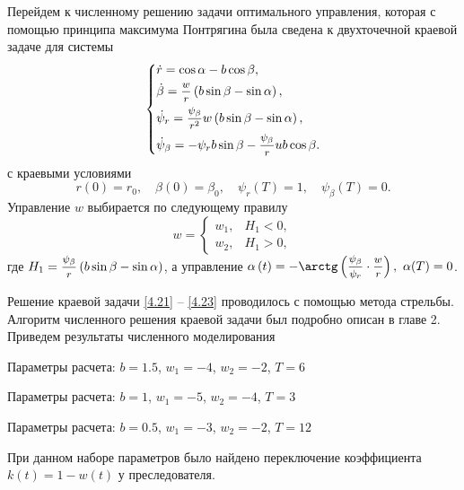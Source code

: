 \documentclass[a4paper,12pt, openany]{book}
\theoremstyle{plain} %
\theoremstyle{definition} %
\theoremstyle{remark} %
\numberwithin{equation}{chapter}
\begin{document}
{Перейдем к численному решению задачи оптимального управления, которая с помощью принципа максимума Понтрягина была сведена к двухточечной краевой задаче для системы 
\begin{equation}\label{4.21}
\left\{ {\begin{aligned}
   &\dot r = \cos \alpha  - b\cos \beta , \hfill  \\
   &\dot \beta  = \mfrac{w}
{r}\left( {b\sin \beta  - \sin \alpha } \right), \hfill  \\
   &\dot \psi _r  = \mfrac{{\psi _\beta  }}
{{r^2 }}w\left( {b\sin \beta  - \sin \alpha } \right), \hfill  \\
   &\dot \psi _\beta   =  - \psi _r b\sin \beta  - \mfrac{{\psi _\beta  }}
{r}ub\cos \beta . \hfill  \\
 \end{aligned} } \right.
\end{equation}
с краевыми условиями
\begin{equation}\label{4.22}
r\left( 0 \right) = r_0, \quad \beta \left( 0 \right) = \beta _0, \quad \psi _r \left( T \right) = 1, \quad \psi _\beta  \left( T \right) = 0.
\end{equation}
Управление $w$ выбирается по следующему правилу
\begin{equation}\label{4.23}
w = 
\begin{cases}
w_1, & H_1 < 0, \\
w_2, & H_1 > 0, 
\end{cases}
\end{equation}
где $H_1  = \mfrac{{\psi _\beta  }}
{r}\left( {b\sin \beta  - \sin \alpha } \right)$, а управление $\alpha \left( t \right) = - \arctg\left( {\mfrac{{\psi _\beta  }}
{{\psi _r }} \cdot \mfrac{w}
{r}} \right), \,\, \alpha(T) = 0$.

Решение краевой задачи \eqref{4.21} -- \eqref{4.23} проводилось с помощью метода стрельбы. Алгоритм численного решения краевой задачи был подробно описан в главе 2. Приведем результаты численного моделирования

Параметры расчета: $b=1.5$, $w_1 = -4$, $w_2 = -2$, $T=6$


\newpage

Параметры расчета: $b=1$, $w_1 = -5$, $w_2 = -4$, $T=3$




Параметры расчета: $b=0.5$, $w_1 = -3$, $w_2 = -2$, $T=12$


При данном наборе параметров было найдено переключение коэффициента $k(t) = 1-w(t)$ у преследователя.  


}
\end{document}
